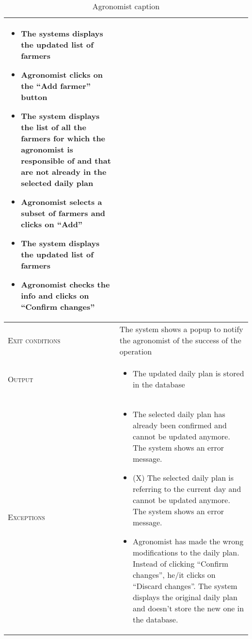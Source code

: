 \begin{table}[H]
\begin{tabular}[c]{|l|p{}|}
\begin{itemize}
                                            \item The systems displays the updated list of farmers
                                            \item Agronomist clicks on the “Add farmer” button
                                            \item The system displays the list of all the farmers for which the agronomist is responsible of and that are not already in the selected daily plan
                                            \item Agronomist selects a subset of farmers and clicks on “Add”
                                            \item The system displays the updated list of farmers
                                            \item Agronomist checks the info and clicks on “Confirm changes”

                                        \end{itemize}\\
        \hline %
        \textsc{Exit conditions}    &  The system shows a popup to notify the agronomist of the success of the operation
        \\
    	\hline %
    	\textsc{Output}             &  \begin{itemize}
    	    \item The updated daily plan is stored in the database
    	\end{itemize}\\
    	\hline %
    	\textsc{Exceptions}         &  \begin{itemize}
    	    \item The selected daily plan has already been confirmed and cannot be updated anymore. The system shows an error message.
    	    \item (X) The selected daily plan is referring to the current day and cannot be updated anymore. The system shows an error message.
    	    \item Agronomist has made the wrong modifications to the daily plan. Instead of clicking “Confirm changes”, he/it clicks on “Discard changes”. The system displays the original daily plan and doesn’t store the new one in the database.    	\end{itemize}\\
    	
    	\hline %
        
    \end{tabular}
    \caption{\label{tab:daily_plan_section_access}Agronomist caption }
\end{table}


